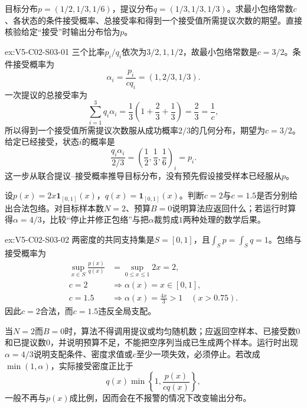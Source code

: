 \begin{SLChapterExercisePairSection}
\begin{exercise}\label{ex:V5-C02-S03-01}
目标分布$p=(1/2,1/3,1/6)$，提议分布$q=(1/3,1/3,1/3)$。求最小包络常数$c$、各状态的条件接受概率、总接受率和得到一个接受值所需提议次数的期望。直接核验给定“接受”时输出分布恰为$p$。
\end{exercise}
\ifSLFullEdition
{}\label{sol:V5-C02-S03-01}
\begin{chapterexercisesolution}{ex:V5-C02-S03-01}
三个比率$p_i/q_i$依次为$3/2,1,1/2$，故最小包络常数是$c=3/2$。条件接受概率为
\[
\alpha_i=\frac{p_i}{cq_i}=(1,2/3,1/3).
\]
一次提议的总接受率为
\[
\sum_{i=1}^3q_i\alpha_i
=\frac13\left(1+\frac23+\frac13\right)=\frac23=\frac1c,
\]
所以得到一个接受值所需提议次数服从成功概率$2/3$的几何分布，期望为$c=3/2$。给定已经接受，状态$i$的概率是
\[
\frac{q_i\alpha_i}{2/3}
=\left(\frac12,\frac13,\frac16\right)_i=p_i.
\]
这一步从联合提议--接受概率推导目标分布，没有预先假设接受样本已经服从$p$。
\end{chapterexercisesolution}
\fi

\begin{exercise}\label{ex:V5-C02-S03-02}
设$p(x)=2x\boldsymbol1_{[0,1]}(x)$，$q(x)=\boldsymbol1_{[0,1]}(x)$。判断$c=2$与$c=1.5$是否分别给出合法包络。对目标样本数$N=2$、预算$B=0$说明算法应返回什么；若运行时算得$\alpha=4/3$，比较“停止并修正包络”与把$\alpha$裁剪成$1$两种处理的数学后果。
\end{exercise}
\ifSLFullEdition
{}\label{sol:V5-C02-S03-02}
\begin{chapterexercisesolution}{ex:V5-C02-S03-02}
两密度的共同支持集是$S=[0,1]$，且$\int_Sp=\int_Sq=1$。包络与接受概率为
\[
\begin{aligned}
\sup_{x\in S}\frac{p(x)}{q(x)}&=\sup_{0\le x\le1}2x=2,\\
c=2&\Longrightarrow \alpha(x)=x\in[0,1],\\
c=1.5&\Longrightarrow \alpha(x)=\frac{4x}{3}>1\quad(x>0.75).
\end{aligned}
\]
因此$c=2$合法，而$c=1.5$违反全局支配。

当$N=2$而$B=0$时，算法不得调用提议或均匀随机数；应返回空样本、已接受数$0$和已提议数$0$，并说明预算不足，不能把空序列当成已生成两个样本。运行时出现$\alpha=4/3$说明支配条件、密度求值或$c$至少一项失效，必须停止。若改成$\min(1,\alpha)$，实际接受密度正比于
\[
q(x)\min\!\left\{1,\frac{p(x)}{cq(x)}\right\},
\]
一般不再与$p(x)$成比例，因而会在不报警的情况下改变输出分布。
\end{chapterexercisesolution}
\fi


\end{SLChapterExercisePairSection}
